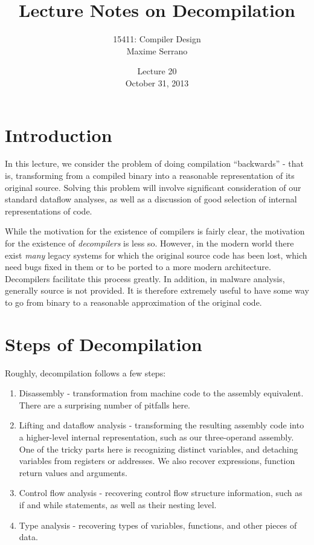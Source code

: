 \documentclass{article}
\title{Lecture Notes on Decompilation}
\author{15411: Compiler Design\\ Maxime Serrano}
\date{Lecture 20\\October 31, 2013}
\begin{document}
\maketitle
\section{Introduction}
In this lecture, we consider the problem of doing compilation ``backwards'' - that is,
transforming from a compiled binary into a reasonable representation of its original
source. Solving this problem will involve significant consideration of our standard
dataflow analyses, as well as a discussion of good selection of internal representations
of code.

While the motivation for the existence of compilers is fairly clear, the motivation
for the existence of {\em decompilers} is less so. However, in the modern world there
exist {\em many} legacy systems for which the original source code has been lost, 
which need bugs fixed in them or to be ported to a more modern architecture. Decompilers
facilitate this process greatly. In addition, in malware analysis, generally source
is not provided. It is therefore extremely useful to have some way to go from binary
to a reasonable approximation of the original code.

\section{Steps of Decompilation}
Roughly, decompilation follows a few steps:
\begin{enumerate}
\item Disassembly - transformation from machine code to the assembly equivalent. There
are a surprising number of pitfalls here.
\item Lifting and dataflow analysis - transforming the resulting assembly code into a
higher-level internal representation, such as our three-operand assembly. One of the
tricky parts here is recognizing distinct variables, and detaching variables from
registers or addresses. We also recover expressions, function return values and arguments.
\item Control flow analysis - recovering control flow structure information, such as
if and while statements, as well as their nesting level.
\item Type analysis - recovering types of variables, functions, and other pieces
of data.
\end{enumerate}
\end{document}
